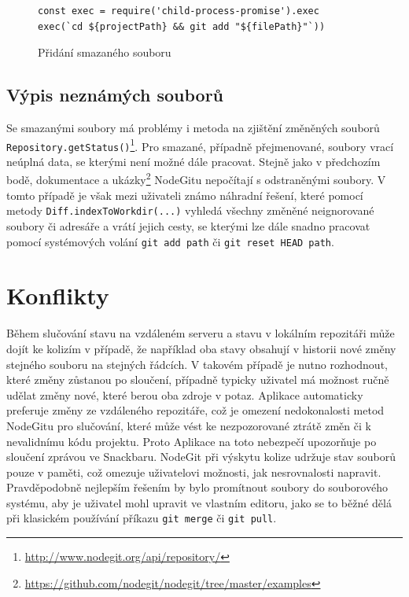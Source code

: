 \FloatBarrier
\begin{figure}[ht]
	\begin{verbatim}
const exec = require('child-process-promise').exec
exec(`cd ${projectPath} && git add "${filePath}"`))
	\end{verbatim}
	\caption{Přidání smazaného souboru}
\end{figure}
\FloatBarrier

\subsection{Výpis neznámých souborů}

Se smazanými soubory má problémy i metoda na zjištění změněných souborů \texttt{Repository.getStatus()}\footnote{\url{http://www.nodegit.org/api/repository/}}. Pro smazané, případně přejmenované, soubory vrací neúplná data, se kterými není možné dále pracovat. Stejně jako v předchozím bodě, dokumentace a ukázky\footnote{\url{https://github.com/nodegit/nodegit/tree/master/examples}} NodeGitu nepočítají s odstraněnými soubory. V tomto případě je však mezi uživateli známo náhradní řešení, které pomocí metody \texttt{Diff.indexToWorkdir(...)} vyhledá všechny změněné neignorované soubory či adresáře a vrátí jejich cesty, se kterými lze dále snadno pracovat pomocí systémových volání \texttt{git add path} či \texttt{git reset HEAD path}.

\section{Konflikty}

Během slučování stavu na vzdáleném serveru a stavu v lokálním repozitáři může dojít ke kolizím v případě, že například oba stavy obsahují v historii nové změny stejného souboru na stejných řádcích. V takovém případě je nutno rozhodnout, které změny zůstanou po sloučení, případně typicky uživatel má možnost ručně udělat změny nové, které berou oba zdroje v potaz. Aplikace automaticky preferuje změny ze vzdáleného repozitáře, což je omezení nedokonalosti metod NodeGitu pro slučování, které může vést ke nezpozorované ztrátě změn či k nevalidnímu kódu projektu. Proto Aplikace na toto nebezpečí upozorňuje po sloučení zprávou ve Snackbaru. NodeGit při výskytu kolize udržuje stav souborů pouze v paměti, což omezuje uživatelovi možnosti, jak nesrovnalosti napravit. Pravděpodobně nejlepším řešením by bylo promítnout soubory do souborového systému, aby je uživatel mohl upravit ve vlastním editoru, jako se to běžné dělá při klasickém používání příkazu \texttt{git merge} či \texttt{git pull}.

